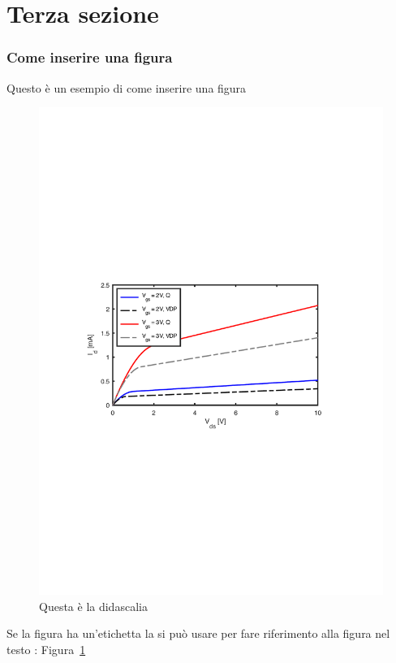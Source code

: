 \documentclass[10pt]{beamer}
\begin{document}
\section{Terza sezione}\label{sec:sec3}

\begin{frame} \frametitle{Come inserire una figura}
Questo è un esempio di come inserire una figura
\begin{figure}
    \centering
    \includegraphics[width=.75\linewidth]{iv.pdf}
    \caption{Questa è la didascalia}
    \label{fig:my_label}
\end{figure}
Se la figura ha un'etichetta la si può usare per fare riferimento
alla figura nel testo : Figura~\ref{fig:my_label}
\end{frame}
\end{document}
